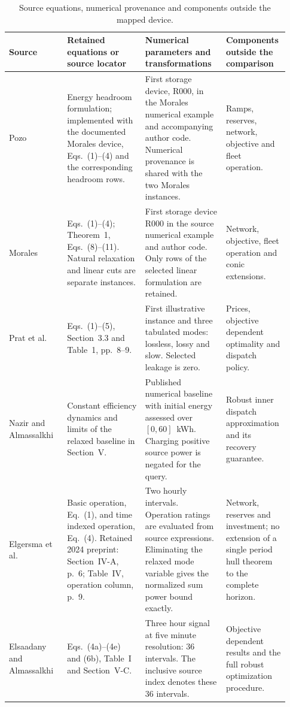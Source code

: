 \begin{landscape}
\begingroup
\begin{longtable}{@{}p{0.16\linewidth}p{0.27\linewidth}p{0.29\linewidth}p{0.21\linewidth}@{}}
\caption{Source equations, numerical provenance and components outside the mapped device.}\label{tab:source_locators}\\
\toprule Source & Retained equations or source locator & Numerical parameters and transformations & Components outside the comparison\\
\midrule\bottomrule
Pozo~\cite{pozo2023convex} & Energy headroom formulation; implemented with the documented Morales device, Eqs.~(1)--(4) and the corresponding headroom rows. & First storage device, R000, in the Morales numerical example and accompanying author code. Numerical provenance is shared with the two Morales instances. & Ramps, reserves, network, objective and fleet operation.\\
Morales~\cite{morales2025linear} & Eqs.~(1)--(4); Theorem~1, Eqs.~(8)--(11). Natural relaxation and linear cuts are separate instances. & First storage device R000 in the source numerical example and author code. Only rows of the selected linear formulation are retained. & Network, objective, fleet operation and conic extensions.\\
Prat et al.~\cite{prat2025sufficient} & Eqs.~(1)--(5), Section~3.3 and Table~1, pp.~8--9. & First illustrative instance and three tabulated modes: lossless, lossy and slow. Selected leakage is zero. & Prices, objective dependent optimality and dispatch policy.\\
Nazir and Almassalkhi~\cite{nazir2021guaranteeing} & Constant efficiency dynamics and limits of the relaxed baseline in Section~V. & Published numerical baseline with initial energy assessed over $[0,60]$~kWh. Charging positive source power is negated for the query. & Robust inner dispatch approximation and its recovery guarantee.\\
Elgersma et al.~\cite{elgersma2026tight} & Basic operation, Eq.~(1), and time indexed operation, Eq.~(4). Retained 2024 preprint: Section~IV-A, p.~6; Table~IV, operation column, p.~9. & Two hourly intervals. Operation ratings are evaluated from source expressions. Eliminating the relaxed mode variable gives the normalized sum power bound exactly. & Network, reserves and investment; no extension of a single period hull theorem to the complete horizon.\\
Elsaadany and Almassalkhi~\cite{elsaadany2023battery} & Eqs.~(4a)--(4e) and (6b), Table~I and Section~V-C. & Three hour signal at five minute resolution: 36 intervals. The inclusive source index denotes these 36 intervals. & Objective dependent results and the full robust optimization procedure.\\

\end{longtable}
\end{landscape}
